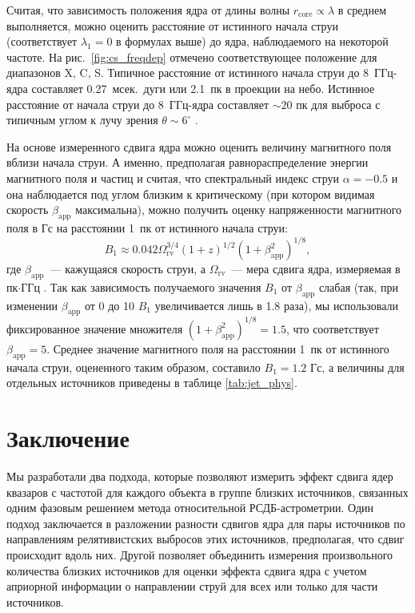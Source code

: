 Считая, что зависимость положения ядра от длины волны $r_\mathrm{core} \propto \lambda$ в среднем
выполняется, можно оценить расстояние от истинного начала струи (соответствует $\lambda_1 = 0$ в
формулах выше) до ядра, наблюдаемого на некоторой частоте. На рис.~\ref{fig:cs_freqdep} отмечено
соответствующее положение для диапазонов X, C, S. Типичное расстояние от истинного начала
струи до 8~ГГц-ядра составляет 0.27~мсек.~дуги или 2.1~пк в проекции на небо. Истинное расстояние
от начала струи до 8~ГГц-ядра составляет $\sim 20$ пк для выброса с типичным углом к лучу зрения
$\theta \sim 6^\circ$ \cite{Hovatta2009}.

На основе измеренного сдвига ядра можно оценить величину магнитного поля вблизи начала струи. А
именно, предполагая равнораспределение энергии магнитного поля и частиц и считая, что спектральный
индекс струи $\alpha=-0.5$ и она наблюдается под углом близким
к критическому (при котором видимая скорость $\beta_\mathrm{app}$ максимальна), можно получить
оценку напряженности магнитного поля в Гс на расстоянии 1~пк от истинного начала струи:
\begin{equation}
B_1 \approx 0.042 \Omega_\mathrm{rv}^{3/4} (1+z)^{1/2} (1+\beta_\mathrm{app}^2)^{1/8},
\label{eq:b1}
\end{equation}
где $\beta_\mathrm{app}$~--- кажущаяся скорость струи, а $\Omega_\mathrm{rv}$~--- мера сдвига ядра,
измеряемая в пк$\cdot$ГГц \cite{Pushkarev_2012}.
Так как зависимость получаемого значения $B_1$ от $\beta_\mathrm{app}$ слабая (так, при изменении
$\beta_\mathrm{app}$ от 0 до 10 $B_1$ увеличивается лишь в 1.8 раза), мы использовали фиксированное
значение множителя $(1+\beta_\mathrm{app}^2)^{1/8} = 1.5$, что соответствует $\beta_\mathrm{app}
= 5$. Среднее значение магнитного поля на расстоянии 1~пк от истинного начала струи, оцененного
таким образом, составило $B_1 = 1.2$ Гс, а величины для отдельных источников приведены в таблице
\ref{tab:jet_phys}.


\section{Заключение}

Мы разработали два подхода, которые позволяют измерить эффект сдвига ядер квазаров с частотой для
каждого объекта в группе близких источников, связанных одним фазовым решением метода относительной
РСДБ-астрометрии. Один подход заключается в разложении разности сдвигов ядра для пары источников по
направлениям релятивистских выбросов этих источников, предполагая, что сдвиг происходит вдоль них.
Другой позволяет объединить измерения произвольного количества близких источников для оценки эффекта
сдвига ядра с учетом априорной информации о направлении струй для всех или только для части
источников.

